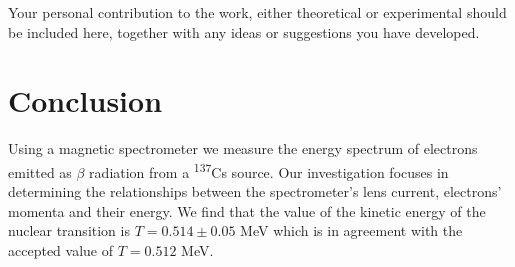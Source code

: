 \documentclass[10pt, a4paper]{article}
\begin{document}
\begin{multicols}{2}
 Your personal contribution to the work, either theoretical or experimental should be included here, together with any ideas or suggestions you have developed.

\section{Conclusion}

Using a magnetic spectrometer we measure the energy spectrum of electrons emitted as $\beta$ radiation from a \textsuperscript{137}Cs source. Our investigation focuses in determining the relationships between the spectrometer's lens current, electrons' momenta and their energy. We find that the value of the kinetic energy of the nuclear transition is $T = 0.514 \pm 0.05$ MeV which is in agreement with the accepted value of $T = 0.512$ MeV.


\end{multicols}


\end{document}
